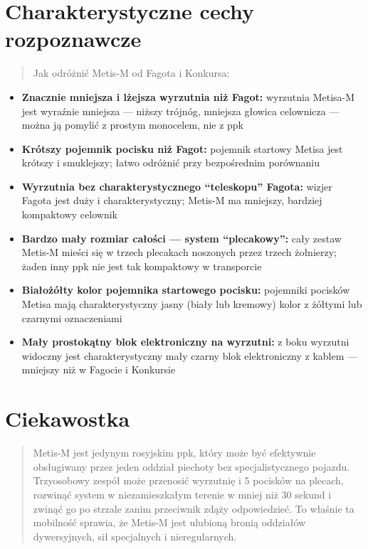 \documentclass[12pt,openany,oneside]{book}
\providecommand{\tightlist}{%
  \setlength{\itemsep}{0pt}\setlength{\parskip}{0pt}}
\begin{document}
\section{Charakterystyczne cechy
rozpoznawcze}\label{charakterystyczne-cechy-rozpoznawcze-37}

\begin{quote}
Jak odróżnić Metis-M od Fagota i Konkursa:
\end{quote}

\begin{itemize}
\tightlist
\item
  \textbf{Znacznie mniejsza i lżejsza wyrzutnia niż Fagot:} wyrzutnia
  Metisa-M jest wyraźnie mniejsza --- niższy trójnóg, mniejsza głowica
  celownicza --- można ją pomylić z prostym monocelem, nie z ppk
\item
  \textbf{Krótszy pojemnik pocisku niż Fagot:} pojemnik startowy Metisa
  jest krótszy i smuklejszy; łatwo odróżnić przy bezpośrednim porównaniu
\item
  \textbf{Wyrzutnia bez charakterystycznego ``teleskopu'' Fagota:}
  wizjer Fagota jest duży i charakterystyczny; Metis-M ma mniejszy,
  bardziej kompaktowy celownik
\item
  \textbf{Bardzo mały rozmiar całości --- system ``plecakowy'':} cały
  zestaw Metis-M mieści się w trzech plecakach noszonych przez trzech
  żołnierzy; żaden inny ppk nie jest tak kompaktowy w transporcie
\item
  \textbf{Białożółty kolor pojemnika startowego pocisku:} pojemniki
  pocisków Metisa mają charakterystyczny jasny (biały lub kremowy) kolor
  z żółtymi lub czarnymi oznaczeniami
\item
  \textbf{Mały prostokątny blok elektroniczny na wyrzutni:} z boku
  wyrzutni widoczny jest charakterystyczny mały czarny blok
  elektroniczny z kablem --- mniejszy niż w Fagocie i Konkursie
\end{itemize}

\section{Ciekawostka}\label{ciekawostka-37}

\begin{quote}
Metis-M jest jedynym rosyjskim ppk, który może być efektywnie
obsługiwany przez jeden oddział piechoty bez specjalistycznego pojazdu.
Trzyosobowy zespół może przenosić wyrzutnię i 5 pocisków na plecach,
rozwinąć system w niezamieszkałym terenie w mniej niż 30 sekund i zwinąć
go po strzale zanim przeciwnik zdąży odpowiedzieć. To właśnie ta
mobilność sprawia, że Metis-M jest ulubioną bronią oddziałów
dywersyjnych, sił specjalnych i nieregularnych.
\end{quote}
\end{document}
